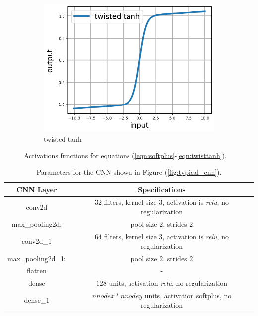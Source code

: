 \documentclass[12pt]{article}
\begin{document}
\begin{figure}[h]
\begin{subfigure}[b]{0.45\linewidth}
    \includegraphics[totalheight=4cm]{Figures/scripts/twistedtanh.png}
    \caption{twisted tanh}
  \end{subfigure}
\caption{\label{fig:activations} Activations functions for equations (\ref{eqn:softplus}-\ref{eqn:twisttanh}).}
\end{figure}
%
\begin{table}
  \centering
 \begin{tabular}{|c|c|}
   \hline
   CNN Layer & Specifications \\
   \hline
   conv2d    & $32$ filters, kernel size $3$, activation is \textit{relu}, no regularization\\
   \hline
   max\_pooling2d: & pool size $2$, strides $2$\\
   \hline
   conv2d\_1 & $64$ filters, kernel size $3$, activation is \textit{relu}, no regularization\\
   \hline
   max\_pooling2d\_1: & pool size $2$, strides $2$\\
   \hline
   flatten & -\\
   \hline
   dense   & $128$ units, activation \textit{relu}, no regularization\\
   \hline
   dense\_1 & $nnodex*nnodey$ units, activation softplus, no regularization\\
   \hline
 \end{tabular}
 \caption{\label{tab:cnnparams} Parameters for the CNN shown in Figure (\ref{fig:typical_cnn}).}
\end{table}
%
\end{document}
